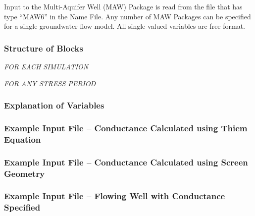 Input to the Multi-Aquifer Well (MAW) Package is read from the file that has type ``MAW6'' in the Name File.  Any number of MAW Packages can be specified for a single groundwater flow model.  All single valued variables are free format.

\vspace{5mm}
\subsubsection{Structure of Blocks}
\vspace{5mm}

\noindent \textit{FOR EACH SIMULATION}




\vspace{5mm}
\noindent \textit{FOR ANY STRESS PERIOD}


\vspace{5mm}
\subsubsection{Explanation of Variables}
\begin{description}

\end{description}

\vspace{5mm}
\subsubsection{Example Input File -- Conductance Calculated using Thiem Equation}

\subsubsection{Example Input File -- Conductance Calculated using Screen Geometry}

\subsubsection{Example Input File -- Flowing Well with Conductance Specified}


